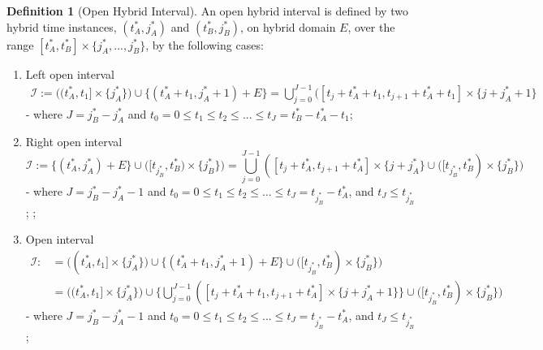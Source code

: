 \documentclass{article}
\theoremstyle{definition}
\newtheorem{definition}{Definition}[section]
\begin{document}
\begin{definition}[Open Hybrid Interval]
An open hybrid interval is defined by two hybrid time instances,
$(t^*_A,j^*_A)$ and $(t^*_B,j^*_B)$, on hybrid domain $E$, over the
range $[t^*_A, t^*_B]\times\{j^*_A,..., j^*_B\}$, by the following cases:

\begin{enumerate}

    \item Left open interval
    \begin{gather}
        \mathcal{I} := \bigg( (t^*_A, t_1] \times \{j^*_A\} \bigg) \cup 
        \bigg\{ (t^*_A + t_1,j^*_A + 1) + E\bigg\} = 
        \bigcup\limits_{j=0}^{J-1} ([t_j+t^*_A+t_1,t_{j+1}+t^*_A+t_1] \times \{j+j^*_A+1\} 
    \end{gather}
    - where $J = j^*_B - j^*_A$ and $t_0 = 0 \leq t_1 \leq t_2 \leq ... \leq
    t_J = t^*_B - t^*_A - t_1$;

    \item Right open interval
    \begin{equation}
        \mathcal{I} :=  \bigg\{(t^*_A,j^*_A) + E\bigg\} \cup \bigg(
        [t_{j^*_B}, t^*_B) \times \{j^*_B\}\bigg)= \bigcup\limits_{j=0}^{J-1} ([t_j+t^*_A,t_{j+1}+t^*_A] \times \{j+j^*_A\} 
                         \cup \bigg(
                            [t_{j^*_B}, t^*_B) \times \{j^*_B\}\bigg)
    \end{equation}
    - where $J = j^*_B - j^*_A - 1$ and $t_0 = 0 \leq t_1 \leq t_2 \leq ...
    \leq t_J = t_{j^*_B} - t^*_A$, and $t_J \leq t_{j^*_B}$;
;

    \item Open interval
     \begin{align}
        \mathcal{I} :&=  \bigg( (t^*_A, t_1] \times \{j^*_A\} \bigg) \cup
        \bigg\{ (t^*_A + t_1,j^*_A + 1) + E\bigg\}
        \cup \bigg( [t_{j^*_B}, t^*_B) \times \{j^*_B\}\bigg) \\
        &=  
        \bigg( (t^*_A, t_1] \times \{j^*_A\} \bigg) \cup
        \bigg\{ \bigcup\limits_{j=0}^{J-1} ([t_j+t^*_A+t_1,t_{j+1}+t^*_A] \times
            \{j+j^*_A+1\} \bigg\}
        \cup \bigg( [t_{j^*_B}, t^*_B) \times \{j^*_B\}\bigg)  
     \end{align}
    - where $J = j^*_B - j^*_A - 1$ and $t_0 = 0 \leq t_1 \leq t_2 \leq ...
    \leq t_J = t_{j^*_B} - t^*_A$, and $t_J \leq t_{j^*_B}$;


\end{enumerate}
\end{definition}
\end{document}
